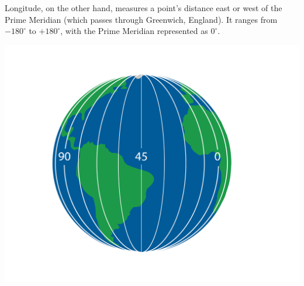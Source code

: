 Longitude, on the other hand, measures a point's distance east or west
of the Prime Meridian (which passes through Greenwich, England). It
ranges from $-180^{\circ}$ to $+180^{\circ}$, with the Prime Meridian
represented as $0^{\circ}$.

\includegraphics[width=\textwidth]{long.png}

